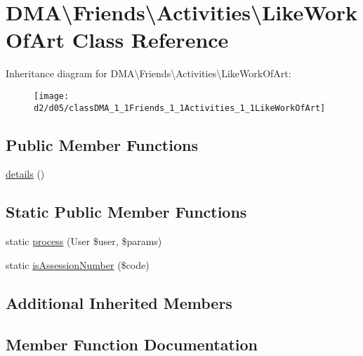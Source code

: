 \hypertarget{classDMA_1_1Friends_1_1Activities_1_1LikeWorkOfArt}{}\section{D\+M\+A\textbackslash{}Friends\textbackslash{}Activities\textbackslash{}Like\+Work\+Of\+Art Class Reference}
\label{classDMA_1_1Friends_1_1Activities_1_1LikeWorkOfArt}
Inheritance diagram for D\+M\+A\textbackslash{}Friends\textbackslash{}Activities\textbackslash{}Like\+Work\+Of\+Art\+:\begin{figure}[H]
\begin{center}
\leavevmode
\texttt{[image: d2/d05/classDMA\_1\_1Friends\_1\_1Activities\_1\_1LikeWorkOfArt]}
\end{center}
\end{figure}
\subsection*{Public Member Functions}
\begin{DoxyCompactItemize}
\item 
\hyperlink{classDMA_1_1Friends_1_1Activities_1_1LikeWorkOfArt_ad8755c7d0fc4f34acfabc7716acfd52c}{details} ()
\end{DoxyCompactItemize}
\subsection*{Static Public Member Functions}
\begin{DoxyCompactItemize}
\item 
static \hyperlink{classDMA_1_1Friends_1_1Activities_1_1LikeWorkOfArt_a814a0bc1a22cc72f91dac635c871b43c}{process} (User \$user, \$params)
\item 
static \hyperlink{classDMA_1_1Friends_1_1Activities_1_1LikeWorkOfArt_ac18459839d22721c79df721a6f9b7f8b}{is\+Assession\+Number} (\$code)
\end{DoxyCompactItemize}
\subsection*{Additional Inherited Members}


\subsection{Member Function Documentation}
\hypertarget{classDMA_1_1Friends_1_1Activities_1_1LikeWorkOfArt_ad8755c7d0fc4f34acfabc7716acfd52c}{}
